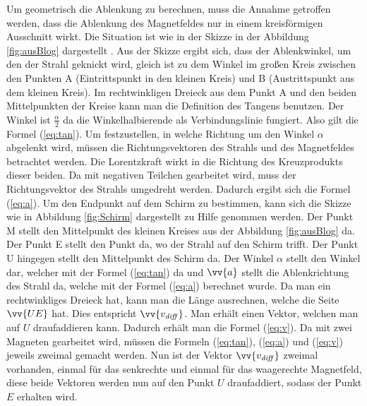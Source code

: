 Um geometrisch die Ablenkung zu berechnen, muss die Annahme getroffen werden, dass die Ablenkung des Magnetfeldes nur in einem kreisförmigen Ausschnitt wirkt.
Die Situation ist wie in der Skizze in der Abbildung \ref{fig:ausBlog} dargestellt \cite{Blog}.
Aus der Skizze ergibt sich, dass der Ablenkwinkel, um den der Strahl geknickt wird, gleich ist zu dem Winkel im großen Kreis zwischen den Punkten A (Eintrittspunkt in den kleinen Kreis) und B (Austrittspunkt aus dem kleinen Kreis).
Im rechtwinkligen Dreieck aus dem Punkt A und den beiden Mittelpunkten der Kreise kann man die Definition des Tangens benutzen.
Der Winkel ist $\frac{\alpha}{2}$ da die Winkelhalbierende als Verbindungslinie fungiert.
Also gilt die Formel (\ref{eq:tan}).
Um festzustellen, in welche Richtung um den Winkel $\alpha$ abgelenkt wird, müssen die Richtungsvektoren des Strahls und des Magnetfeldes betrachtet werden.
Die Lorentzkraft wirkt in die Richtung des Kreuzprodukts dieser beiden.
Da mit negativen Teilchen gearbeitet wird, muss der Richtungsvektor des Strahls umgedreht werden. Dadurch ergibt sich die Formel (\ref{eq:a}).
Um den Endpunkt auf dem Schirm zu bestimmen, kann sich die Skizze wie in Abbildung \ref{fig:Schirm} dargestellt zu Hilfe genommen werden.
Der Punkt M stellt den Mittelpunkt des kleinen Kreises aus der Abbildung \ref{fig:ausBlog} da.
Der Punkt E stellt den Punkt da, wo der Strahl auf den Schirm trifft.
Der Punkt U hingegen stellt den Mittelpunkt des Schirm da.
Der Winkel $\alpha$ stellt den Winkel dar, welcher mit der Formel (\ref{eq:tan}) da und $\vv{a}$ stellt die Ablenkrichtung des Strahl da, welche mit der Formel (\ref{eq:a}) berechnet wurde.
Da man ein rechtwinkliges Dreieck hat, kann man die Länge ausrechnen, welche die Seite $\vv{UE}$ hat.
Dies entspricht $\vv{v_\mathit{diff}}$.
Man erhält einen Vektor, welchen man auf $U$ draufaddieren kann.
Dadurch erhält man die Formel (\ref{eq:v}).
Da mit zwei Magneten gearbeitet wird, müssen die Formeln (\ref{eq:tan}), (\ref{eq:a}) und (\ref{eq:v}) jeweils zweimal gemacht werden.
Nun ist der Vektor $\vv{v_\mathit{diff}}$ zweimal vorhanden, einmal für das senkrechte und einmal für das waagerechte Magnetfeld, diese beide Vektoren werden nun auf den Punkt $U$ draufaddiert, sodass der Punkt $E$ erhalten wird.

